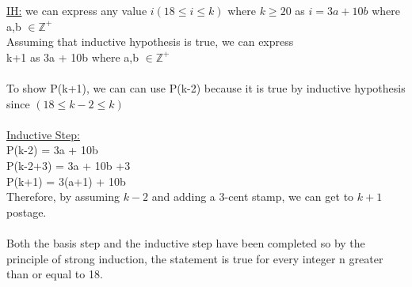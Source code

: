 \documentclass{article}
\begin{document}
\begin{enumerate}[(1. ]
\underline{IH:} we can express any value $i(18 \leq i \leq k)$ where $k \geq 20$ as $i=3a + 10b$ where a,b $ \in  \mathbb{Z}^+ $ \\

Assuming that inductive hypothesis is true, we can express \\
k+1 as 3a + 10b  where a,b $ \in  \mathbb{Z}^+ $ \\ \\
To show P(k+1), we can can use P(k-2) because it is true by inductive hypothesis since $(18 \leq k-2 \leq k) $ \\ \\
\underline{Inductive Step:} \\
P(k-2) = 3a + 10b \\ 
P(k-2+3) = 3a + 10b +3 \\
P(k+1) = 3(a+1) + 10b \\
Therefore, by assuming $k-2$ and adding a 3-cent stamp, we can get to $k+1$  postage. \\ \\
Both the basis step and the inductive step have been completed so by the principle of strong induction, the statement is true for every integer n greater than or equal to 18.


\end{enumerate}
\end{document}
